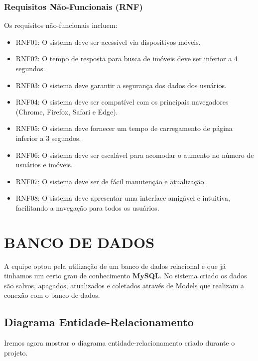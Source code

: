 \subsubsection{Requisitos Não-Funcionais (RNF)}
Os requisitos não-funcionais incluem:
\begin{itemize}
    \item RNF01: O sistema deve ser acessível via dispositivos móveis.
    \item RNF02: O tempo de resposta para busca de imóveis deve ser inferior a 4 segundos.
    \item RNF03: O sistema deve garantir a segurança dos dados dos usuários.
    \item RNF04: O sistema deve ser compatível com os principais navegadores (Chrome, Firefox, Safari e Edge).
    \item RNF05: O sistema deve fornecer um tempo de carregamento de página inferior a 3 segundos.
    \item RNF06: O sistema deve ser escalável para acomodar o aumento no número de usuários e imóveis.
    \item RNF07: O sistema deve ser de fácil manutenção e atualização.
    \item RNF08: O sistema deve apresentar uma interface amigável e intuitiva, facilitando a navegação para todos os usuários.

\end{itemize}



\section{BANCO DE DADOS}

A equipe optou pela utilização de um banco de dados relacional e que já tinhamos um certo grau de conhecimento \textbf{MySQL}.
No sistema criado os dados são salvos, apagados, atualizados e coletados através de Models que realizam a conexão com o banco de dados.

\subsection{Diagrama Entidade-Relacionamento}

Iremos agora mostrar o diagrama entidade-relacionamento criado durante o projeto.

